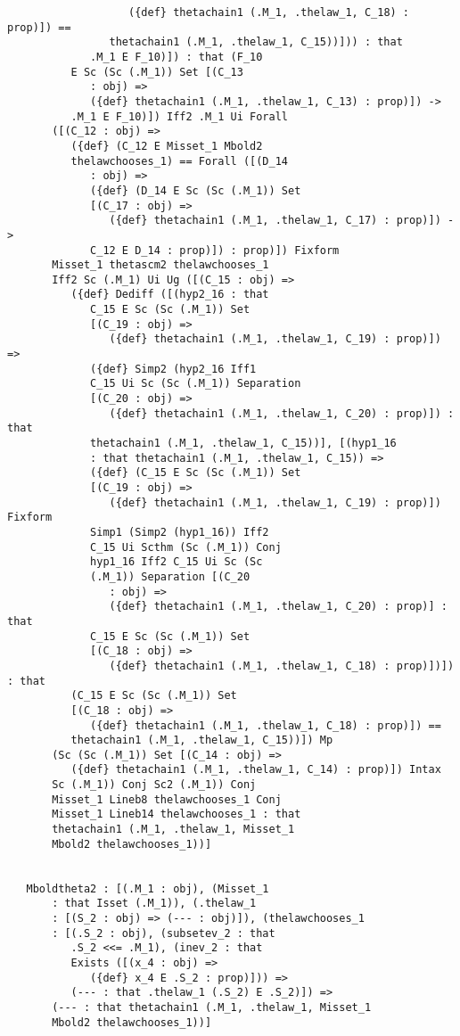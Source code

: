 \documentclass[12pt]{article}
\begin{document}
\begin{verbatim}
                   ({def} thetachain1 (.M_1, .thelaw_1, C_18) : prop)]) == 
                thetachain1 (.M_1, .thelaw_1, C_15))])) : that 
             .M_1 E F_10)]) : that (F_10 
          E Sc (Sc (.M_1)) Set [(C_13 
             : obj) => 
             ({def} thetachain1 (.M_1, .thelaw_1, C_13) : prop)]) -> 
          .M_1 E F_10)]) Iff2 .M_1 Ui Forall 
       ([(C_12 : obj) => 
          ({def} (C_12 E Misset_1 Mbold2 
          thelawchooses_1) == Forall ([(D_14 
             : obj) => 
             ({def} (D_14 E Sc (Sc (.M_1)) Set 
             [(C_17 : obj) => 
                ({def} thetachain1 (.M_1, .thelaw_1, C_17) : prop)]) -> 
             C_12 E D_14 : prop)]) : prop)]) Fixform 
       Misset_1 thetascm2 thelawchooses_1 
       Iff2 Sc (.M_1) Ui Ug ([(C_15 : obj) => 
          ({def} Dediff ([(hyp2_16 : that 
             C_15 E Sc (Sc (.M_1)) Set 
             [(C_19 : obj) => 
                ({def} thetachain1 (.M_1, .thelaw_1, C_19) : prop)]) => 
             ({def} Simp2 (hyp2_16 Iff1 
             C_15 Ui Sc (Sc (.M_1)) Separation 
             [(C_20 : obj) => 
                ({def} thetachain1 (.M_1, .thelaw_1, C_20) : prop)]) : that 
             thetachain1 (.M_1, .thelaw_1, C_15))], [(hyp1_16 
             : that thetachain1 (.M_1, .thelaw_1, C_15)) => 
             ({def} (C_15 E Sc (Sc (.M_1)) Set 
             [(C_19 : obj) => 
                ({def} thetachain1 (.M_1, .thelaw_1, C_19) : prop)]) Fixform 
             Simp1 (Simp2 (hyp1_16)) Iff2 
             C_15 Ui Scthm (Sc (.M_1)) Conj 
             hyp1_16 Iff2 C_15 Ui Sc (Sc 
             (.M_1)) Separation [(C_20 
                : obj) => 
                ({def} thetachain1 (.M_1, .thelaw_1, C_20) : prop)] : that 
             C_15 E Sc (Sc (.M_1)) Set 
             [(C_18 : obj) => 
                ({def} thetachain1 (.M_1, .thelaw_1, C_18) : prop)])]) : that 
          (C_15 E Sc (Sc (.M_1)) Set 
          [(C_18 : obj) => 
             ({def} thetachain1 (.M_1, .thelaw_1, C_18) : prop)]) == 
          thetachain1 (.M_1, .thelaw_1, C_15))]) Mp 
       (Sc (Sc (.M_1)) Set [(C_14 : obj) => 
          ({def} thetachain1 (.M_1, .thelaw_1, C_14) : prop)]) Intax 
       Sc (.M_1)) Conj Sc2 (.M_1)) Conj 
       Misset_1 Lineb8 thelawchooses_1 Conj 
       Misset_1 Lineb14 thelawchooses_1 : that 
       thetachain1 (.M_1, .thelaw_1, Misset_1 
       Mbold2 thelawchooses_1))]


   Mboldtheta2 : [(.M_1 : obj), (Misset_1 
       : that Isset (.M_1)), (.thelaw_1 
       : [(S_2 : obj) => (--- : obj)]), (thelawchooses_1 
       : [(.S_2 : obj), (subsetev_2 : that 
          .S_2 <<= .M_1), (inev_2 : that 
          Exists ([(x_4 : obj) => 
             ({def} x_4 E .S_2 : prop)])) => 
          (--- : that .thelaw_1 (.S_2) E .S_2)]) => 
       (--- : that thetachain1 (.M_1, .thelaw_1, Misset_1 
       Mbold2 thelawchooses_1))]



\end{verbatim}
\end{document}
